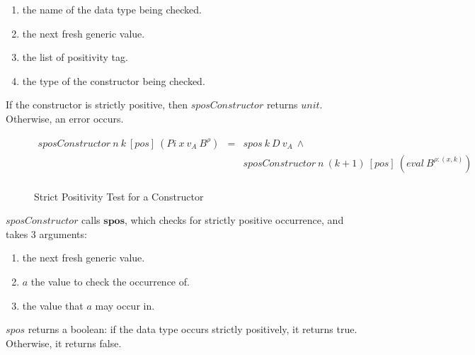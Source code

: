 \begin{enumerate}
  \item the name of the data type being checked.
  \item the next fresh generic value.
  \item the list of positivity tag.
  \item the type of the constructor being checked.
\end{enumerate}

If the constructor is strictly positive, then $sposConstructor$ returns $unit$. Otherwise, an error occurs.

\begin{figure}[H]
  \begin{equation*}
    \begin{aligned}
      sposConstructor \: n \: k \: [pos] \: (Pi \: x \: v_A \: B^{\rho}) & = & spos \: k \: D \: v_A \: \land                                     \\
                                                                         &   & sposConstructor \: n \: (k+1) \: [pos] \: (eval \: B^{\rho:(x,k)}) \\
    \end{aligned}
  \end{equation*}
  \caption{Strict Positivity Test for a Constructor}
\end{figure}

$sposConstructor$ calls $\boldsymbol{spos}$, which checks for strictly positive occurrence, and takes 3 arguments:

\begin{enumerate}
  \item the next fresh generic value.
  \item $a$ the value to check the occurrence of.
  \item the value that $a$ may occur in.
\end{enumerate}

$spos$ returns a boolean: if the data type occurs strictly positively, it returns true. Otherwise, it returns false.

